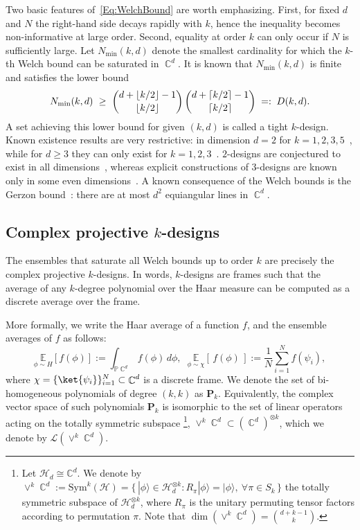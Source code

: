 \documentclass[aps,twocolumn,pra,superscriptaddress,nofootinbib]{revtex4-2}
\DeclareMathOperator{\C}{\mathbb{C}} %
\begin{document}
Two basic features of~\eqref{Eq:WelchBound} are worth emphasizing. First, for fixed $d$ and $N$ the right-hand side
decays rapidly with $k$, hence the inequality becomes non-informative at large order.
Second, equality at order $k$ can only occur if $N$ is sufficiently large.
Let $N_{\min}(k,d)$ denote the smallest cardinality for which the $k$-th Welch bound can be saturated in $\C^d$.
It is known that $N_{\min}(k,d)$ is finite~\cite{Existence-k-design(1984)} and satisfies the lower bound
\cite{Levenshtein1992,Dunkl1979DiscreteQA,SmallestT-design(2007)}
\begin{equation}\label{Eq:NminLowerBound}
  \small N_{\min}(k,d)\ \ge\
  \binom{d+\lfloor k/2\rfloor-1}{\lfloor k/2\rfloor}\,
  \binom{d+\lceil k/2\rceil-1}{\lceil k/2\rceil}
  \;=:\; D(k,d).
\end{equation}
A set achieving this lower bound for given $(k,d)$ is called a tight $k$-design. Known existence results are very restrictive: in dimension $d=2$ for
$k=1,2,3,5$~\cite{ThightFramesExistence(1996)}, while for $d\ge3$ they can only exist
for $k=1,2,3$~\cite{BannaiHoggar1985,Hoggar1989,BannaiHoggar(1989)}. $2$-designs
are conjectured to exist in all dimensions~\cite{renes2004symmetric,Zauner1999},
whereas explicit constructions of $3$-designs are known only in some even
dimensions~\cite{hoggar1982t}.
A known consequence of the Welch bounds is the Gerzon bound~\cite{GerzonBound(1974)}:
there are at most $d^2$ equiangular lines in $\C^d$.


\subsection{Complex projective $k$-designs}

The ensembles that saturate all Welch bounds up to order $k$ are precisely the
complex projective $k$-designs.
In words, $k$-designs are frames such that the average of any $k$-degree polynomial over the Haar measure can be computed as a discrete average over the frame. 


More formally, we write the Haar average of a function $f$, and the ensemble averages of $f$ as follows:
\[
\underset{\phi\sim H}{\mathbb{E}}[f(\phi)]
:=\int_{\mathbb{P}\C^{d}}f(\phi)\,d\phi,
\;\; 
\underset{\phi\sim \chi}{\mathbb{E}}[\,f(\phi)\,]
:=\frac{1}{N}\sum_{i=1}^{N}f(\psi_i),
\]
where $\chi=\{\ket{\psi_i}\}_{i=1}^N\subset\C^{d}$ is a discrete frame.
We denote the set of bi-homogeneous polynomials of degree
$(k,k)$ as $\mathbf{P}_{k}$. Equivalently, the complex vector space of such polynomials $\mathbf{P}_{k}$ is isomorphic to the set of linear operators acting on the totally symmetric subspace \footnote{Let $\mathcal H_d \cong \mathbb C^d$. We denote by
$\vee^k\C^d := \mathrm{Sym}^k(\mathcal H)
= \{\,|\phi\rangle \in \mathcal H_d^{\otimes k} : R_\pi |\phi\rangle = |\phi\rangle,\ \forall \pi\in S_k\,\}$
the totally symmetric subspace of $\mathcal{H}_d^{\otimes k}$, where $R_\pi$ is the unitary permuting tensor factors according to permutation $\pi$. Note that $\dim(\vee^k\C^d)=\binom{d+k-1}{k}$.}, $\vee^{k}\C^d\subset(\C^d)^{\otimes k}$, which we denote by $\mathcal{L}(\vee^{k}\C^d)$. 
\end{document}
